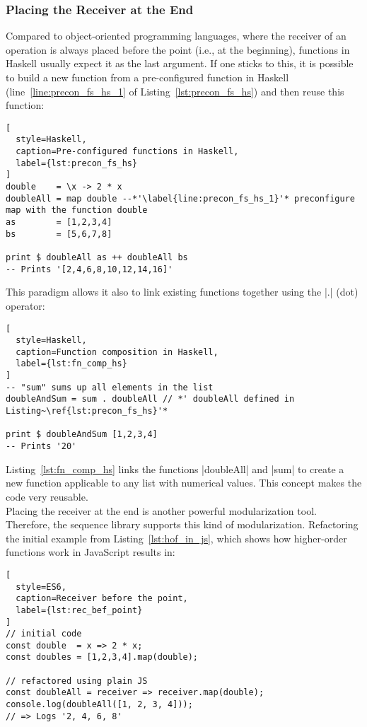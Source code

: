 \subsubsection{Placing the Receiver at the End} %
\label{subsub:Placing the Receiver at the End}
Compared to object-oriented programming languages, where the receiver of an
operation is always placed before the point (i.e., at the beginning), functions
in Haskell usually expect it as the last argument. If one sticks to this, it is
possible to build a new function from a pre-configured function in Haskell
(line~\ref{line:precon_fs_hs_1} of Listing~\ref{lst:precon_fs_hs}) and then
reuse this function:

\begin{lstlisting}[
  style=Haskell,
  caption=Pre-configured functions in Haskell,
  label={lst:precon_fs_hs}
]
double    = \x -> 2 * x
doubleAll = map double --*'\label{line:precon_fs_hs_1}'* preconfigure map with the function double
as        = [1,2,3,4]
bs        = [5,6,7,8]

print $ doubleAll as ++ doubleAll bs
-- Prints '[2,4,6,8,10,12,14,16]'
\end{lstlisting}

This paradigm allows it also to link existing functions together using the |.|
(dot) operator:

\begin{lstlisting}[
  style=Haskell,
  caption=Function composition in Haskell,
  label={lst:fn_comp_hs}
]
-- "sum" sums up all elements in the list
doubleAndSum = sum . doubleAll // *' doubleAll defined in Listing~\ref{lst:precon_fs_hs}'*

print $ doubleAndSum [1,2,3,4]
-- Prints '20'
\end{lstlisting}

Listing~\ref{lst:fn_comp_hs} links the functions |doubleAll| and |sum| to
create a new function applicable to any list with numerical values. This
concept makes the code very reusable.\\
Placing the receiver at the end is another powerful modularization
tool. Therefore, the sequence library supports this kind of modularization.
Refactoring the initial example from Listing~\ref{lst:hof_in_js}, which 
shows how higher-order functions work in JavaScript results in:

\begin{lstlisting}[
  style=ES6,
  caption=Receiver before the point,
  label={lst:rec_bef_point}
]
// initial code
const double  = x => 2 * x;
const doubles = [1,2,3,4].map(double);

// refactored using plain JS
const doubleAll = receiver => receiver.map(double);
console.log(doubleAll([1, 2, 3, 4]));
// => Logs '2, 4, 6, 8'
\end{lstlisting}

